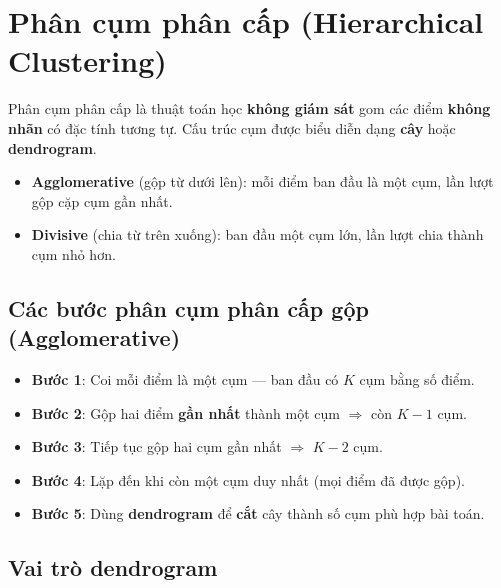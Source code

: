 \section{Phân cụm phân cấp (Hierarchical Clustering)}
\label{sec:hierarchical}

\begin{dinhnghia}[title={Phân cụm phân cấp}]
Phân cụm phân cấp là thuật toán học \textbf{không giám sát} gom các điểm \textbf{không nhãn} có đặc tính tương tự. Cấu trúc cụm được biểu diễn dạng \textbf{cây} hoặc \textbf{dendrogram}.
\end{dinhnghia}

\begin{phuongphap}[title={Hai họ thuật toán}]
\begin{itemize}
  \item \textbf{Agglomerative} (gộp từ dưới lên): mỗi điểm ban đầu là một cụm, lần lượt gộp cặp cụm gần nhất.
  \item \textbf{Divisive} (chia từ trên xuống): ban đầu một cụm lớn, lần lượt chia thành cụm nhỏ hơn.
\end{itemize}
\end{phuongphap}

\subsection{Các bước phân cụm phân cấp gộp (Agglomerative)}

\begin{phuongphap}[title={Quy trình}]
\begin{itemize}
  \item \textbf{Bước 1}: Coi mỗi điểm là một cụm --- ban đầu có $K$ cụm bằng số điểm.
  \item \textbf{Bước 2}: Gộp hai điểm \textbf{gần nhất} thành một cụm $\Rightarrow$ còn $K-1$ cụm.
  \item \textbf{Bước 3}: Tiếp tục gộp hai cụm gần nhất $\Rightarrow$ $K-2$ cụm.
  \item \textbf{Bước 4}: Lặp đến khi còn một cụm duy nhất (mọi điểm đã được gộp).
  \item \textbf{Bước 5}: Dùng \textbf{dendrogram} để \textbf{cắt} cây thành số cụm phù hợp bài toán.
\end{itemize}
\end{phuongphap}

\subsection{Vai trò dendrogram}

